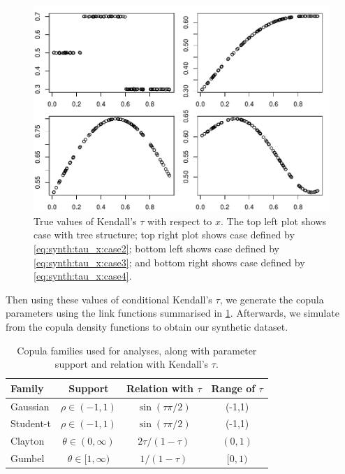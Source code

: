 \documentclass{amsart}
\begin{document}
\begin{figure}
	\centering
	\includegraphics[width=0.95\linewidth]{true_tau.pdf}
	\caption{True values of Kendall's $\tau$ with respect to $x$. The top left plot shows case with tree structure; top right plot shows case defined by \cref{eq:synth:tau_x:case2}; bottom left shows case defined by \cref{eq:synth:tau_x:case3}; and bottom right shows case defined by \cref{eq:synth:tau_x:case4}.}
	\label{fig:true:tau}
\end{figure}

Then using these values of conditional Kendall's $\tau$, we generate the copula parameters using the link functions summarised in \cref{tab:cop:link}. Afterwards, we simulate from the copula density functions to obtain our synthetic dataset.

\begin{table}
	\centering
	\begin{tabular}{l|c|c|c}
		\toprule
		Family & Support & Relation with $\tau$ & Range of $\tau$ \\
		\midrule
		Gaussian & $\rho \in (-1,1)$ & $\sin(\tau\pi/2)$ & (-1,1)\\
		Student-t & $\rho \in (-1,1)$ & $\sin(\tau\pi/2)$ & (-1,1) \\
		Clayton & $\theta \in (0,\infty)$ & $2\tau/(1-\tau)$ & $(0,1)$ \\
		Gumbel & $\theta\in [1,\infty)$ & $1/(1-\tau)$  & $[0,1)$ \\
		\bottomrule
	\end{tabular}
	\caption{Copula families used for analyses, along with parameter support and relation with Kendall's $\tau$.}
	\label{tab:cop:link}
\end{table}
\end{document}
